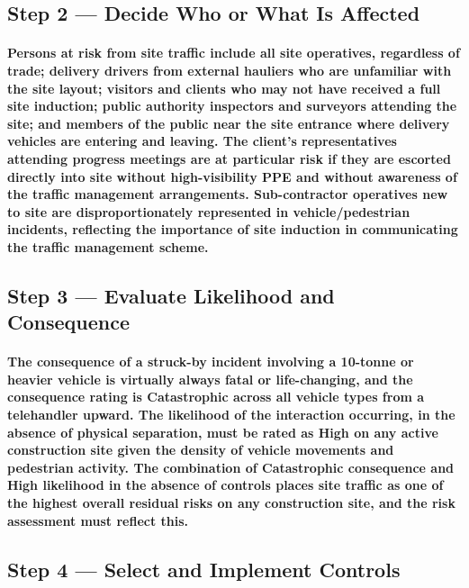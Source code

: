 \subsection{Step 2 --- Decide Who or What Is Affected}
\paragraph{Persons at risk from site traffic include all site operatives, regardless of trade; delivery drivers from external hauliers who are unfamiliar with the site layout; visitors and clients who may not have received a full site induction; public authority inspectors and surveyors attending the site; and members of the public near the site entrance where delivery vehicles are entering and leaving. The client's representatives attending progress meetings are at particular risk if they are escorted directly into site without high-visibility PPE and without awareness of the traffic management arrangements. Sub-contractor operatives new to site are disproportionately represented in vehicle/pedestrian incidents, reflecting the importance of site induction in communicating the traffic management scheme.}

\subsection{Step 3 --- Evaluate Likelihood and Consequence}
\paragraph{The consequence of a struck-by incident involving a 10-tonne or heavier vehicle is virtually always fatal or life-changing, and the consequence rating is Catastrophic across all vehicle types from a telehandler upward. The likelihood of the interaction occurring, in the absence of physical separation, must be rated as High on any active construction site given the density of vehicle movements and pedestrian activity. The combination of Catastrophic consequence and High likelihood in the absence of controls places site traffic as one of the highest overall residual risks on any construction site, and the risk assessment must reflect this.}

\subsection{Step 4 --- Select and Implement Controls}
